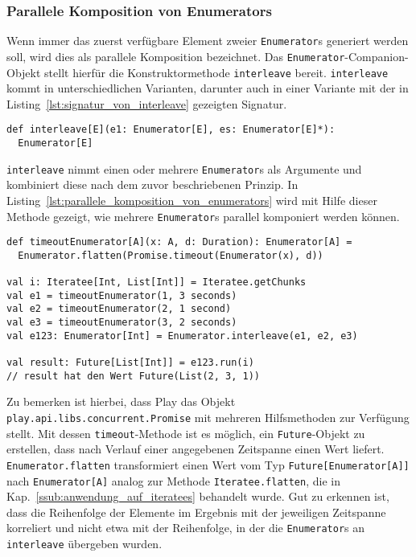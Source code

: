 
\subsubsection{Parallele Komposition von Enumerators} %
\label{ssub:anwendung_parallele_komposition_von_enumerators}

Wenn immer das zuerst verfügbare Element zweier \lstinline|Enumerator|s generiert werden soll, wird dies als parallele Komposition bezeichnet.
Das \lstinline|Enumerator|-Companion-Objekt stellt hierfür die Konstruktormethode \lstinline|interleave| bereit.
\lstinline|interleave| kommt in unterschiedlichen Varianten, darunter auch in einer Variante mit der in Listing~\ref{lst:signatur_von_interleave} gezeigten Signatur.

\begin{lstlisting}[caption=Die Signatur von interleave, label=lst:signatur_von_interleave]
def interleave[E](e1: Enumerator[E], es: Enumerator[E]*):
  Enumerator[E]
\end{lstlisting}

\lstinline|interleave| nimmt einen oder mehrere \lstinline|Enumerator|s als Argumente und kombiniert diese nach dem zuvor beschriebenen Prinzip.
In Listing~\ref{lst:parallele_komposition_von_enumerators} wird mit Hilfe dieser Methode gezeigt, wie mehrere \lstinline|Enumerator|s parallel komponiert werden können.

\begin{lstlisting}[caption=Parallele Komposition von Enumerators, label=lst:parallele_komposition_von_enumerators]
def timeoutEnumerator[A](x: A, d: Duration): Enumerator[A] =
  Enumerator.flatten(Promise.timeout(Enumerator(x), d))

val i: Iteratee[Int, List[Int]] = Iteratee.getChunks
val e1 = timeoutEnumerator(1, 3 seconds)
val e2 = timeoutEnumerator(2, 1 second)
val e3 = timeoutEnumerator(3, 2 seconds)
val e123: Enumerator[Int] = Enumerator.interleave(e1, e2, e3)

val result: Future[List[Int]] = e123.run(i)
// result hat den Wert Future(List(2, 3, 1))
\end{lstlisting}

Zu bemerken ist hierbei, dass Play das Objekt \lstinline|play.api.libs.concurrent.Promise| mit mehreren Hilfsmethoden zur Verfügung stellt.
Mit dessen \lstinline|timeout|-Methode ist es möglich, ein \lstinline|Future|-Objekt zu erstellen, dass nach Verlauf einer angegebenen Zeitspanne einen Wert liefert.
\lstinline|Enumerator.flatten| transformiert einen Wert vom Typ \lstinline|Future[Enumerator[A]]| nach \lstinline|Enumerator[A]| analog zur Methode \lstinline|Iteratee.flatten|, die in Kap.~\ref{ssub:anwendung_auf_iteratees} behandelt wurde.
Gut zu erkennen ist, dass die Reihenfolge der Elemente im Ergebnis mit der jeweiligen Zeitspanne korreliert und nicht etwa mit der Reihenfolge, in der die \lstinline|Enumerator|s an \lstinline|interleave| übergeben wurden.

